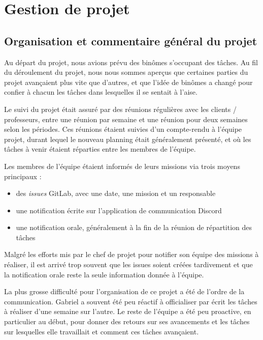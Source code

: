 \chapter{Gestion de projet}


\section{Organisation et commentaire général du projet}

Au départ du projet, nous avions prévu des binômes s'occupant
des tâches. Au fil du déroulement du projet, nous nous sommes
aperçus que certaines parties du projet avançaient plus vite
que d'autres, et que l'idée de binômes a changé pour confier
à chacun les tâches dans lesquelles il se sentait à l'aise.
\newline

Le suivi du projet était assuré par des réunions régulières
avec les clients / professeurs, entre une réunion par semaine
et une réunion pour deux semaines selon les périodes. Ces
réunions étaient suivies d'un compte-rendu à l'équipe projet,
durant lequel le nouveau planning était généralement présenté,
et où les tâches à venir étaient réparties entre les membres
de l'équipe.
\newline

Les membres de l'équipe étaient informés de leurs missions
via trois moyens principaux :
\begin{itemize}
  \item des \textit{issues} GitLab, avec une date, une mission et un responsable
  \item une notification écrite sur l'application de communication Discord
  \item une notification orale, généralement à la fin de la réunion de répartition des tâches
\end{itemize}
Malgré les efforts mis par le chef de projet pour notifier son
équipe des missions à réaliser, il est arrivé trop souvent
que les issues soient créées tardivement et que la
notification orale reste la seule information donnée à
l'équipe.
\newline

La plus grosse difficulté pour l'organisation de ce projet a
été de l'ordre de la communication. Gabriel a souvent été peu
réactif à officialiser par écrit les tâches à réaliser d'une
semaine sur l'autre. Le reste de l'équipe a été peu proactive,
en particulier au début, pour donner des retours sur ses
avancements et les tâches sur lesquelles elle travaillait et
comment ces tâches avançaient.

